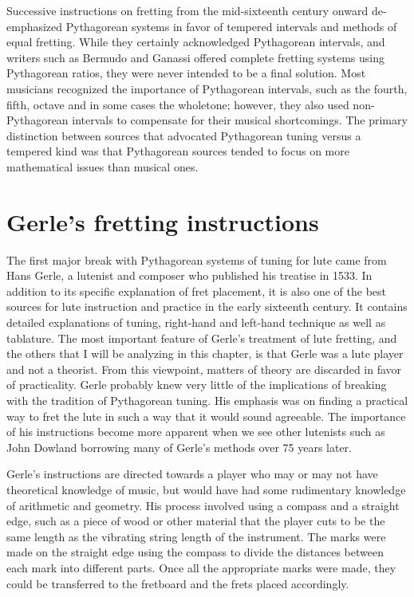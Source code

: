 Successive instructions on fretting from the mid-sixteenth century onward de-emphasized
Pythagorean systems in favor of tempered intervals and methods of equal fretting.  While
they certainly acknowledged Pythagorean intervals, and writers such as Bermudo and Ganassi
offered complete fretting systems using Pythagorean ratios, they were never intended to be
a final solution. Most musicians recognized the importance of Pythagorean intervals, such
as the fourth, fifth, octave and in some cases the wholetone; however, they also used
non-Pythagorean intervals to compensate for their musical shortcomings.  The primary
distinction between sources that advocated Pythagorean tuning versus a tempered kind was
that Pythagorean sources tended to focus on more mathematical issues than musical ones.


%
%
\section{Gerle's fretting instructions}

The first major break with Pythagorean systems of tuning for lute came from Hans Gerle, a
lutenist and composer who published his treatise in 1533.  In addition to its specific
explanation of fret placement, it is also one of the best sources for lute instruction and
practice in the early sixteenth century.  It contains detailed explanations of tuning,
right-hand and left-hand technique as well as tablature.  The most important feature of
Gerle's treatment of lute fretting, and the others that I will be analyzing in this
chapter, is that Gerle was a lute player and not a theorist. From this viewpoint, matters
of theory are discarded in favor of practicality.  Gerle probably knew very little of the
implications of breaking with the tradition of Pythagorean tuning.  His emphasis was on
finding a practical way to fret the lute in such a way that it would sound agreeable.  The
importance of his instructions become more apparent when we see other lutenists such as
John Dowland borrowing many of Gerle's methods over 75 years later.

Gerle's instructions are directed towards a player who may or may not have theoretical
knowledge of music, but would have had some rudimentary knowledge of arithmetic and
geometry.  His process involved using a compass and a straight edge, such as a piece of
wood or other material that the player cuts to be the same length as the vibrating string
length of the instrument.  The marks were made on the straight edge using the compass to
divide the distances between each mark into different parts.  Once all the appropriate
marks were made, they could be transferred to the fretboard and the frets placed
accordingly.

